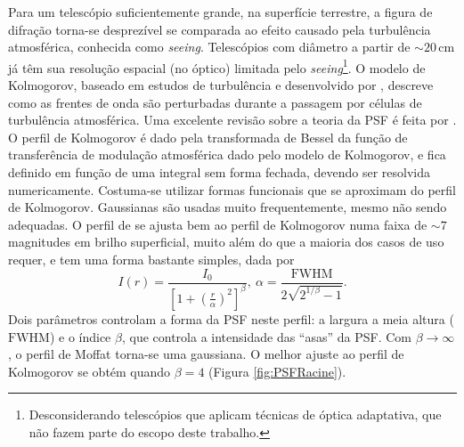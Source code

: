 Para um telescópio suficientemente grande, na superfície terrestre, a figura de
difração torna-se desprezível se comparada ao efeito causado pela turbulência
atmosférica, conhecida como {\em seeing}. Telescópios com diâmetro a partir de
$\sim\!20\,\mathrm{cm}$ já têm sua resolução espacial (no óptico) limitada pelo
{\em seeing}\footnote{Desconsiderando telescópios que aplicam técnicas de óptica
adaptativa, que não fazem parte do escopo deste trabalho.}. O modelo de
Kolmogorov, baseado em estudos de turbulência e desenvolvido por
\citet{Tatarskii1961}, descreve como as frentes de onda são perturbadas durante
a passagem por células de turbulência atmosférica. Uma excelente revisão sobre a
teoria da PSF é feita por \citet{Racine1996}. O perfil de Kolmogorov é dado pela
transformada de Bessel da função de transferência de modulação atmosférica dado
pelo modelo de Kolmogorov, e fica definido em função de uma integral sem forma
fechada, devendo ser resolvida numericamente. Costuma-se utilizar formas
funcionais que se aproximam do perfil de Kolmogorov. Gaussianas são usadas muito
frequentemente, mesmo não sendo adequadas. O perfil de \citet{Moffat1969} se
ajusta bem ao perfil de Kolmogorov numa faixa de $\sim\!7$ magnitudes em brilho
superficial, muito além do que a maioria dos casos de uso requer, e tem uma
forma bastante simples, dada por
\begin{equation*}
I(r) = \frac{I_0}{\left[1 + \left(\frac{r}{\alpha}\right)^2\right]^\beta},
\ \alpha = \frac{\mathrm{FWHM}}{2\sqrt{2^{1/\beta} - 1}}.
\end{equation*}
Dois parâmetros controlam a forma da PSF neste perfil: a largura a meia altura
($\mathrm{FWHM}$) e o índice $\beta$, que controla a intensidade das ``asas'' da
PSF. Com $\beta\!\to\!\infty$, o perfil de Moffat torna-se uma gaussiana. O
melhor ajuste ao perfil de Kolmogorov se obtém quando $\beta\!=\!4$ (Figura
\ref{fig:PSFRacine}).

